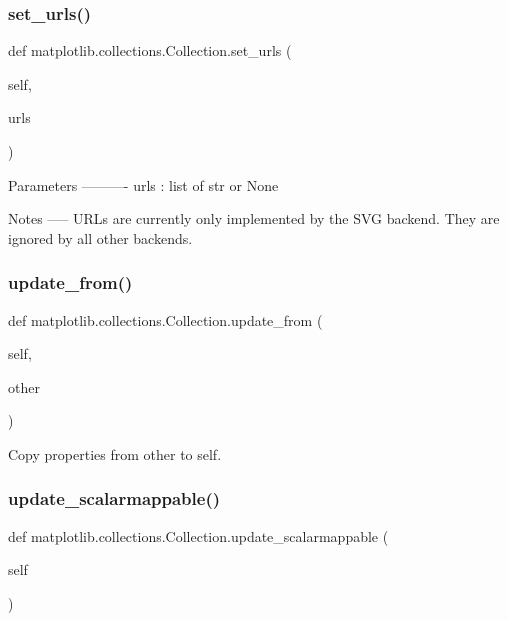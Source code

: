 \subsubsection{\texorpdfstring{set\+\_\+urls()}{set\_urls()}}
{\footnotesize\ttfamily def matplotlib.\+collections.\+Collection.\+set\+\_\+urls (\begin{DoxyParamCaption}\item[{}]{self,  }\item[{}]{urls }\end{DoxyParamCaption})}

\begin{DoxyVerb}Parameters
----------
urls : list of str or None

Notes
-----
URLs are currently only implemented by the SVG backend. They are
ignored by all other backends.
\end{DoxyVerb}
 \mbox{\label{classmatplotlib_1_1collections_1_1Collection_affaa099f3fe01ba427144742ba9781ba}} 
\subsubsection{\texorpdfstring{update\+\_\+from()}{update\_from()}}
{\footnotesize\ttfamily def matplotlib.\+collections.\+Collection.\+update\+\_\+from (\begin{DoxyParamCaption}\item[{}]{self,  }\item[{}]{other }\end{DoxyParamCaption})}

\begin{DoxyVerb}Copy properties from other to self.\end{DoxyVerb}
 \mbox{\label{classmatplotlib_1_1collections_1_1Collection_a132faeb3364d2b65c136f61ca6e47487}} 
\subsubsection{\texorpdfstring{update\+\_\+scalarmappable()}{update\_scalarmappable()}}
{\footnotesize\ttfamily def matplotlib.\+collections.\+Collection.\+update\+\_\+scalarmappable (\begin{DoxyParamCaption}\item[{}]{self }\end{DoxyParamCaption})}

